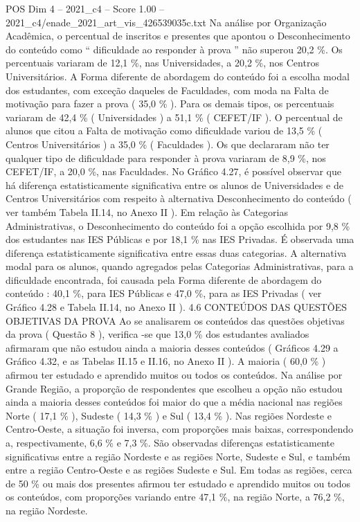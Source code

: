 \begin{textsample}{POS Dim 4 – 2021\_c4 – Score 1.00 – 2021\_c4/enade\_2021\_art\_vis\_426539035c.txt}
Na análise por Organização Acadêmica, o percentual de inscritos e presentes que apontou o Desconhecimento do conteúdo como “ dificuldade ao responder à prova ” não superou 20,2 \%.
Os percentuais variaram de 12,1 \%, nas Universidades, a 20,2 \%, nos Centros Universitários.
A Forma diferente de abordagem do conteúdo foi a escolha modal dos estudantes, com exceção daqueles de Faculdades, com moda na Falta de motivação para fazer a prova ( 35,0 \% ).
Para os demais tipos, os percentuais variaram de 42,4 \% ( Universidades ) a 51,1 \% ( CEFET/IF ).
O percentual de alunos que citou a Falta de motivação como dificuldade variou de 13,5 \% ( Centros Universitários ) a 35,0 \% ( Faculdades ).
Os que declararam não ter qualquer tipo de dificuldade para responder à prova variaram de 8,9 \%, nos CEFET/IF, a 20,0 \%, nas Faculdades.
No Gráfico 4.27, é possível observar que há diferença estatisticamente significativa entre os alunos de Universidades e de Centros Universitários com respeito à alternativa Desconhecimento do conteúdo ( ver também Tabela II.14, no Anexo II ).
Em relação às Categorias Administrativas, o Desconhecimento do conteúdo foi a opção escolhida por 9,8 \% dos estudantes nas IES Públicas e por 18,1 \% nas IES Privadas.
É observada uma diferença estatisticamente significativa entre essas duas categorias.
A alternativa modal para os alunos, quando agregados pelas Categorias Administrativas, para a dificuldade encontrada, foi causada pela Forma diferente de abordagem do conteúdo : 40,1 \%, para IES Públicas e 47,0 \%, para as IES Privadas ( ver Gráfico 4.28 e Tabela II.14, no Anexo II ). 4.6 CONTEÚDOS DAS QUESTÕES OBJETIVAS DA PROVA Ao se analisarem os conteúdos das questões objetivas da prova ( Questão 8 ), verifica -se que 13,0 \% dos estudantes avaliados afirmaram que não estudou ainda a maioria desses conteúdos ( Gráficos 4.29 a Gráfico 4.32, e as Tabelas II.15 e II.16, no Anexo II ).
A maioria ( 60,0 \% ) afirmou ter estudado e aprendido muitos ou todos os conteúdos.
Na análise por Grande Região, a proporção de respondentes que escolheu a opção não estudou ainda a maioria desses conteúdos foi maior do que a média nacional nas regiões Norte ( 17,1 \% ), Sudeste ( 14,3 \% ) e Sul ( 13,4 \% ).
Nas regiões Nordeste e Centro-Oeste, a situação foi inversa, com proporções mais baixas, correspondendo a, respectivamente, 6,6 \% e 7,3 \%.
São observadas diferenças estatisticamente significativas entre a região Nordeste e as regiões Norte, Sudeste e Sul, e também entre a região Centro-Oeste e as regiões Sudeste e Sul.
Em todas as regiões, cerca de 50 \% ou mais dos presentes afirmou ter estudado e aprendido muitos ou todos os conteúdos, com proporções variando entre 47,1 \%, na região Norte, a 76,2 \%, na região Nordeste.

\end{textsample}
